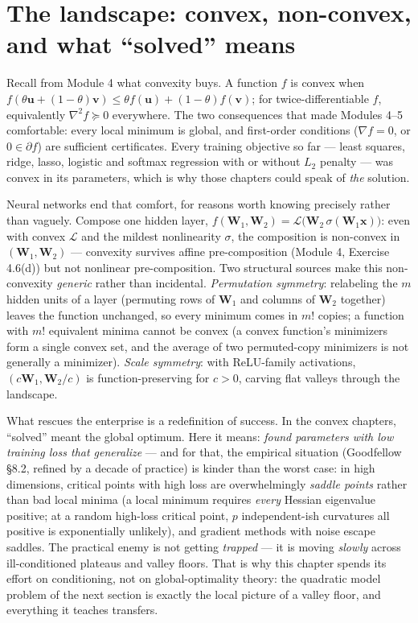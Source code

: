 \documentclass[11pt]{article}
\numberwithin{equation}{section}
\theoremstyle{plain}
\theoremstyle{definition}
\theoremstyle{remark}
\newcommand{\x}{\bm{x}}
\begin{document}
\section{The landscape: convex, non-convex, and what ``solved'' means}\label{sec:landscape}

Recall from Module 4 what convexity buys. A function $f$ is convex when $f(\theta \bm u + (1-\theta)\bm v) \le \theta f(\bm u) + (1-\theta) f(\bm v)$; for twice-differentiable $f$, equivalently $\nabla^2 f \succeq 0$ everywhere. The two consequences that made Modules 4--5 comfortable: every local minimum is global, and first-order conditions ($\nabla f = 0$, or $0 \in \partial f$) are sufficient certificates. Every training objective so far --- least squares, ridge, lasso, logistic and softmax regression with or without $L_2$ penalty --- was convex in its parameters, which is why those chapters could speak of \emph{the} solution.

Neural networks end that comfort, for reasons worth knowing precisely rather than vaguely. Compose one hidden layer, $f(\bm W_1, \bm W_2) = \mathcal{L}\big(\bm W_2\, \sigma(\bm W_1 \x)\big)$: even with convex $\mathcal{L}$ and the mildest nonlinearity $\sigma$, the composition is non-convex in $(\bm W_1, \bm W_2)$ --- convexity survives affine pre-composition (Module 4, Exercise 4.6(d)) but not nonlinear pre-composition. Two structural sources make this non-convexity \emph{generic} rather than incidental. \emph{Permutation symmetry}: relabeling the $m$ hidden units of a layer (permuting rows of $\bm W_1$ and columns of $\bm W_2$ together) leaves the function unchanged, so every minimum comes in $m!$ copies; a function with $m!$ equivalent minima cannot be convex (a convex function's minimizers form a single convex set, and the average of two permuted-copy minimizers is not generally a minimizer). \emph{Scale symmetry}: with ReLU-family activations, $(c\bm W_1, \bm W_2/c)$ is function-preserving for $c > 0$, carving flat valleys through the landscape.

What rescues the enterprise is a redefinition of success. In the convex chapters, ``solved'' meant the global optimum. Here it means: \emph{found parameters with low training loss that generalize} --- and for that, the empirical situation (Goodfellow \S8.2, refined by a decade of practice) is kinder than the worst case: in high dimensions, critical points with high loss are overwhelmingly \emph{saddle points} rather than bad local minima (a local minimum requires \emph{every} Hessian eigenvalue positive; at a random high-loss critical point, $p$ independent-ish curvatures all positive is exponentially unlikely), and gradient methods with noise escape saddles. The practical enemy is not getting \emph{trapped} --- it is moving \emph{slowly} across ill-conditioned plateaus and valley floors. That is why this chapter spends its effort on conditioning, not on global-optimality theory: the quadratic model problem of the next section is exactly the local picture of a valley floor, and everything it teaches transfers.
\end{document}
